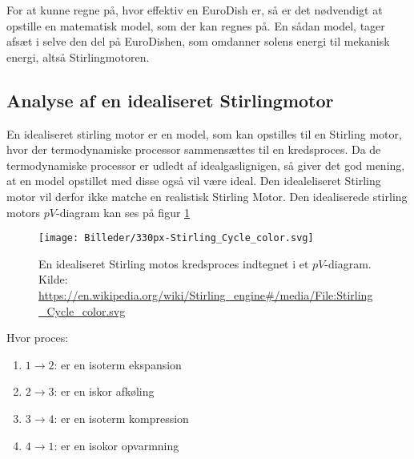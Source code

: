 \documentclass[SRC.tex]{subfiles}
\begin{document}
	
	For at kunne regne på, hvor effektiv en EuroDish er, så er det nødvendigt at opstille
	en matematisk model, som der kan regnes på. En sådan model, tager afsæt i selve den del
	på EuroDishen, som omdanner solens energi til mekanisk energi, altså Stirlingmotoren. 
	
	\subsection{Analyse af en idealiseret Stirlingmotor}
	En idealiseret stirling motor er en model, som kan opstilles til en 
	Stirling motor, hvor der termodynamiske processor sammensættes til en kredsproces. Da 
	de termodynamiske processor er udledt af idealgaslignigen, så giver det 
	god mening, at en model opstillet med disse også vil være ideal. Den idealeliseret Stirling motor vil derfor ikke matche en realistisk Stirling Motor. Den idealiserede stirling motors \(pV\)-diagram kan ses på figur \ref{fig:stirlingcycle}
	
	\begin{figure}[h!]
		\centering
		\texttt{[image: Billeder/330px-Stirling\_Cycle\_color.svg]}
		\caption{En idealiseret Stirling motos kredsproces indtegnet i et \(pV\)-diagram. Kilde: \url{https://en.wikipedia.org/wiki/Stirling_engine#/media/File:Stirling_Cycle_color.svg}}
		\label{fig:stirlingcycle}
	\end{figure}
	

	Hvor proces:
	\begin{enumerate}[]
		\item \quad \(1 \rightarrow 2\): er en isoterm ekspansion
		\item \quad \(2 \rightarrow 3\): er en iskor afkøling
		\item \quad \(3 \rightarrow 4\): er en isoterm kompression
		\item \quad \(4 \rightarrow 1\): er en isokor opvarmning
	\end{enumerate}
	
	
\end{document}

